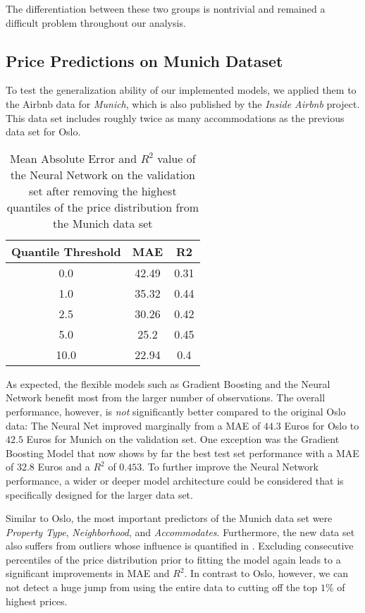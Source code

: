 The differentiation between these two groups is nontrivial and remained a difficult problem throughout our analysis.


\subsection{Price Predictions on Munich Dataset}

To test the generalization ability of our implemented models, we applied them to the Airbnb data for \emph{Munich}, which is also published by the \emph{Inside Airbnb} project.
This data set includes roughly twice as many accommodations as the previous data set for Oslo.

\begin{table}[t]
  \centering
  \begin{tabular}{@{}ccc@{}}
    \toprule
    Quantile Threshold & MAE   & R2   \\ \midrule
    0.0                & 42.49 & 0.31 \\
    1.0                & 35.32 & 0.44 \\
    2.5                & 30.26 & 0.42 \\
    5.0                & 25.2  & 0.45 \\
    10.0               & 22.94 & 0.4  \\ \bottomrule
  \end{tabular}
  \caption{Mean Absolute Error and $R^2$ value of the Neural Network on the validation set after removing the highest quantiles of the price distribution from the Munich data set}
  \label{tab:munich-outliers}
\end{table}

As expected, the flexible models such as Gradient Boosting and the Neural Network benefit most from the larger number of observations.
The overall performance, however, is \emph{not} significantly better compared to the original Oslo data:
The Neural Net improved marginally from a MAE of $44.3$ Euros for Oslo to $42.5$ Euros for Munich on the validation set.
One exception was the Gradient Boosting Model that now shows by far the best test set performance with a MAE of $32.8$ Euros and a $R^2$ of $0.453$.
To further improve the Neural Network performance, a wider or deeper model architecture could be considered that is specifically designed for the larger data set.

Similar to Oslo, the most important predictors of the Munich data set were \emph{Property Type}, \emph{Neighborhood}, and \emph{Accommodates}.
Furthermore, the new data set also suffers from outliers whose influence is quantified in .
Excluding consecutive percentiles of the price distribution prior to fitting the model again leads to a significant improvements in MAE and $R^2$.
In contrast to Oslo, however, we can not detect a huge jump from using the entire data to cutting off the top $1$\% of highest prices.









